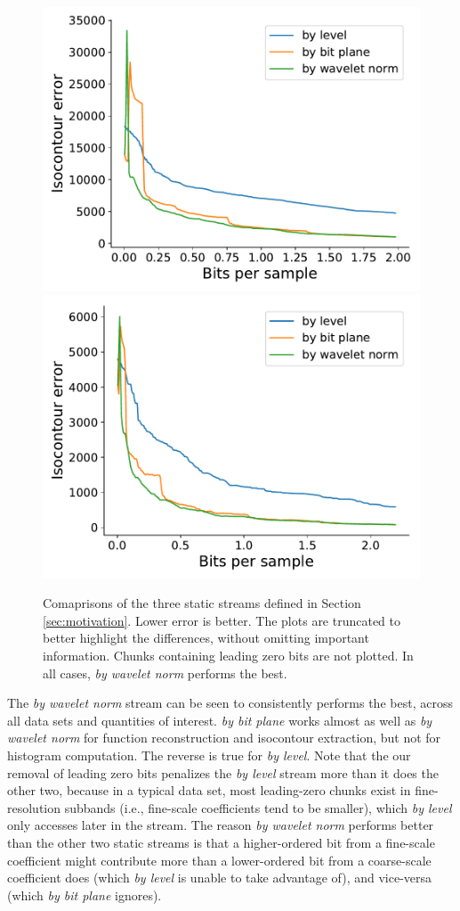 \begin{figure}[h]
{  {\includegraphics[width=0.48\linewidth]{img/motivation/motivation-isocontour-plasma.pdf}}
  {\includegraphics[width=0.48\linewidth]{img/motivation/motivation-isocontour-turbulence.pdf}}}
  \caption{Comaprisons of the three static streams defined in Section \ref{sec:motivation}. Lower
  error is better. The plots are truncated to better highlight the differences, without omitting
  important information. Chunks containing leading zero bits are not plotted. In all cases, \emph{by
  wavelet norm} performs the best.}
 	\label{fig:motivation-rmse}
\end{figure}

The \emph{by wavelet norm} stream can be seen to consistently performs the best, across all data
sets and quantities of interest. \emph{by bit plane} works almost as well as \emph{by wavelet norm}
for function reconstruction and isocontour extraction, but not for histogram computation. The
reverse is true for \emph{by level}. Note that the our removal of leading zero bits penalizes the
\emph{by level} stream more than it does the other two, because in a typical data set, most
leading-zero chunks exist in fine-resolution subbands (i.e., fine-scale coefficients tend to be
smaller), which \emph{by level} only accesses later in the stream. The reason \emph{by wavelet norm}
performs better than the other two static streams is that a higher-ordered bit from a fine-scale
coefficient might contribute more than a lower-ordered bit from a coarse-scale coefficient does
(which \emph{by level} is unable to take advantage of), and vice-versa (which \emph{by bit plane}
ignores).

